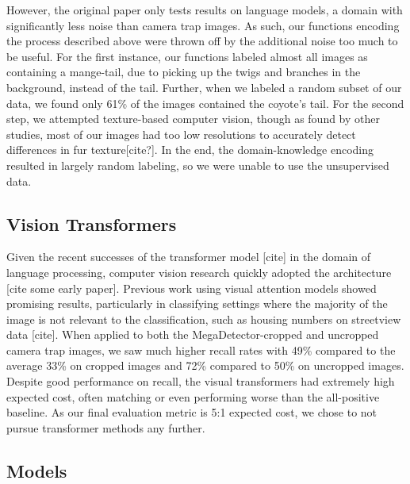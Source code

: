\documentclass{article}
\begin{document}
However, the original paper only tests results on language models, a domain with significantly less noise than camera trap images. As such, our functions encoding the process described above were thrown off by the additional noise too much to be useful. For the first instance, our functions labeled almost all images as containing a mange-tail, due to picking up the twigs and branches in the background, instead of the tail. Further, when we labeled a random subset of our data, we found only 61\% of the images contained the coyote’s tail. For the second step, we attempted texture-based computer vision, though as found by other studies, most of our images had too low resolutions to accurately detect differences in fur texture[cite?]. In the end, the domain-knowledge encoding resulted in largely random labeling, so we were unable to use the unsupervised data.

\subsection{Vision Transformers}
Given the recent successes of the transformer model [cite] in the domain of language processing, computer vision research quickly adopted the architecture [cite some early paper].  Previous work using visual attention models showed promising results, particularly in classifying settings where the majority of the image is not relevant to the classification, such as housing numbers on streetview data [cite]. When applied to both the MegaDetector-cropped and uncropped camera trap images, we saw much higher recall rates with 49\% compared to the average 33\% on cropped images and 72\% compared to 50\% on uncropped images. Despite good performance on recall, the visual transformers had extremely high expected cost, often matching or even performing worse than the all-positive baseline. As our final evaluation metric is 5:1 expected cost, we chose to not pursue transformer methods any further.

\subsection{Models}
\end{document}
